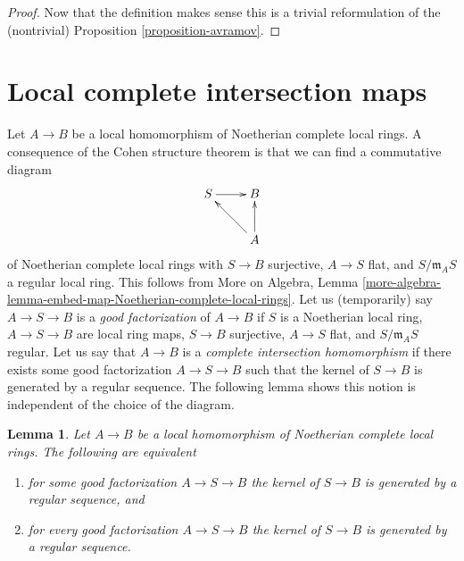 \documentclass{stacks-project}
\theoremstyle{plain}
\newtheorem{lemma}[subsection]{Lemma}
\theoremstyle{definition}
\theoremstyle{remark}
\numberwithin{equation}{subsection}
\begin{document}
\begin{proof}
Now that the definition makes sense this is a trivial reformulation
of the (nontrivial) Proposition \ref{proposition-avramov}.
\end{proof}









\section{Local complete intersection maps}
\label{section-lci-homomorphisms}

\noindent
Let $A \to B$ be a local homomorphism of Noetherian complete local rings.
A consequence of the Cohen structure theorem is that we can find a
commutative diagram
$$
\xymatrix{
S \ar[r] & B \\
& A \ar[lu] \ar[u]
}
$$
of Noetherian complete local rings with
$S \to B$ surjective, $A \to S$ flat, and
$S/\mathfrak m_A S$ a regular local ring. This follows from
More on Algebra, Lemma
\ref{more-algebra-lemma-embed-map-Noetherian-complete-local-rings}.
Let us (temporarily) say $A \to S \to B$ is a {\it good factorization}
of $A \to B$ if $S$ is a Noetherian local ring,
$A \to S \to B$ are local ring maps,
$S \to B$ surjective, $A \to S$ flat, and $S/\mathfrak m_AS$ regular.
Let us say that $A \to B$ is a
{\it complete intersection homomorphism}
if there exists some good factorization $A \to S \to B$
such that the kernel of $S \to B$ is generated by a regular sequence.
The following lemma shows this notion is independent of
the choice of the diagram.

\begin{lemma}
\label{lemma-ci-map-well-defined}
Let $A \to B$ be a local homomorphism of Noetherian complete local rings.
The following are equivalent
\begin{enumerate}
\item for some good factorization $A \to S \to B$ the kernel of
$S \to B$ is generated by a regular sequence, and
\item for every good factorization $A \to S \to B$ the kernel of
$S \to B$ is generated by a regular sequence.
\end{enumerate}
\end{lemma}
\end{document}
